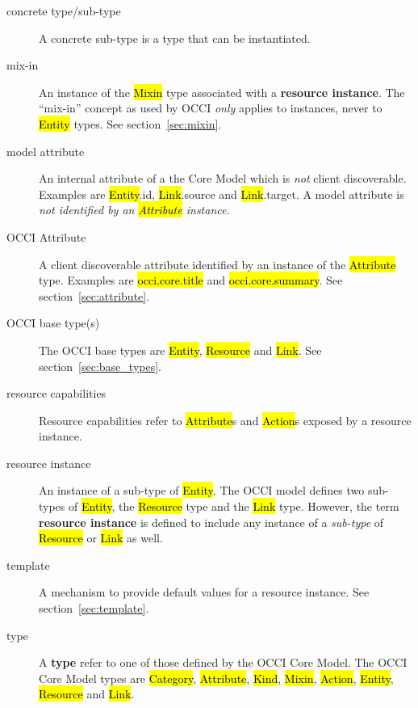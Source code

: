 \documentclass[10pt,a4paper]{article}
\begin{document}
\begin{description}
  \item[concrete type/sub-type] A concrete sub-type is a type that can
    be instantiated.

  \item[mix-in] An instance of the \hl{Mixin} type associated with a
    {\bf resource instance}. The ``mix-in'' concept as used by OCCI
    {\em only} applies to instances, never to \hl{Entity} types.
    See section~\ref{sec:mixin}.

  \item[model attribute] An internal attribute of a the Core Model which is
    {\em not} client discoverable. Examples are \hl{Entity}.id,
    \hl{Link}.source and \hl{Link}.target. A model attribute is \em{not}
    identified by an \hl{Attribute} instance.

  \item[OCCI Attribute] A client discoverable attribute identified by an
    instance of the \hl{Attribute} type. Examples are \hl{occi.core.title}
    and \hl{occi.core.summary}. See section~\ref{sec:attribute}.

  \item[OCCI base type(s)] The OCCI base types are \hl{Entity},
    \hl{Resource} and \hl{Link}.
    See section~\ref{sec:base_types}.

  \item[resource capabilities] Resource capabilities refer to
    \hl{Attribute}s and \hl{Action}s exposed by a resource instance.

  \item[resource instance] An instance of a sub-type of
    \hl{Entity}. The OCCI model defines two sub-types of \hl{Entity},
    the \hl{Resource} type and the \hl{Link} type.  However, the term
    {\bf resource instance} is defined to include any instance of a
    {\em sub-type} of \hl{Resource} or \hl{Link} as well.

  \item[template] A mechanism to provide default values for a resource
    instance. See section~\ref{sec:template}.

  \item[type] A {\bf type} refer to one of those defined by the OCCI
    Core Model.  The OCCI Core Model types are \hl{Category},
    \hl{Attribute},
    \hl{Kind}, \hl{Mixin}, \hl{Action}, \hl{Entity}, \hl{Resource} and
    \hl{Link}.
\end{description}
\end{document}
